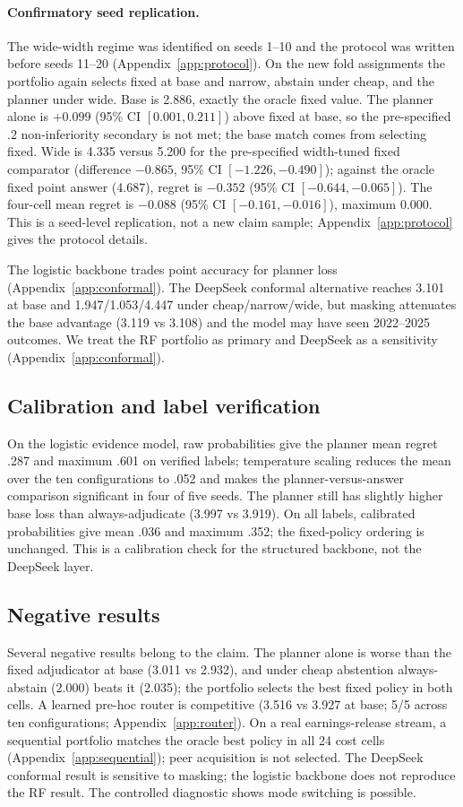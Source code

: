 \documentclass[11pt]{article}
\begin{document}
\paragraph{Confirmatory seed replication.}
The wide-width regime was identified on seeds 1--10 and the protocol was
written before seeds 11--20 (Appendix~\ref{app:protocol}). On the new fold
assignments the portfolio again selects fixed at base and narrow, abstain
under cheap, and the planner under wide. Base is 2.886, exactly the oracle
fixed value. The planner alone is $+0.099$ (95\% CI $[0.001,0.211]$) above
fixed at base, so the pre-specified $.2$ non-inferiority secondary is not met;
the base match comes from selecting fixed. Wide is 4.335 versus 5.200 for the
pre-specified width-tuned fixed comparator (difference $-0.865$, 95\% CI
$[-1.226,-0.490]$); against the oracle fixed point answer (4.687), regret is
\(-0.352\) (95\% CI \([-0.644,-0.065]\)). The four-cell mean regret is
\(-0.088\) (95\% CI \([-0.161,-0.016]\)), maximum 0.000. This is a seed-level
replication, not a new claim sample; Appendix~\ref{app:protocol} gives the
protocol details.

The logistic backbone trades point accuracy for planner loss
(Appendix~\ref{app:conformal}). The DeepSeek conformal alternative reaches
3.101 at base and 1.947/1.053/4.447 under cheap/narrow/wide, but masking
attenuates the base advantage (3.119 vs 3.108) and the model may have seen
2022--2025 outcomes. We treat the RF portfolio as primary and DeepSeek as a
sensitivity (Appendix~\ref{app:conformal}).
\subsection{Calibration and label verification}
On the logistic evidence model, raw probabilities give the planner mean regret .287 and maximum .601 on verified labels; temperature scaling reduces the mean over the ten configurations to .052 and makes the planner-versus-answer comparison significant in four of five seeds. The planner still has slightly higher base loss than always-adjudicate (3.997 vs 3.919). On all labels, calibrated probabilities give mean .036 and maximum .352; the fixed-policy ordering is unchanged. This is a calibration check for the structured backbone, not the DeepSeek layer.

\subsection{Negative results}
Several negative results belong to the claim. The planner alone is worse than the fixed adjudicator at base (3.011 vs 2.932), and under cheap abstention always-abstain (2.000) beats it (2.035); the portfolio selects the best fixed policy in both cells. A learned pre-hoc router is competitive (3.516 vs 3.927 at base; 5/5 across ten configurations; Appendix~\ref{app:router}). On a real earnings-release stream, a sequential portfolio matches the oracle best policy in all 24 cost cells (Appendix~\ref{app:sequential}); peer acquisition is not selected. The DeepSeek conformal result is sensitive to masking; the logistic backbone does not reproduce the RF result. The controlled diagnostic shows mode switching is possible.
\end{document}
